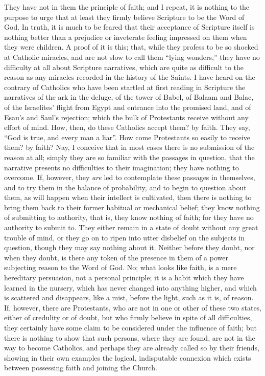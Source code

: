 They have not in them the principle of faith; and I repeat, it is
nothing to the purpose to urge that at least they firmly believe
Scripture to be the Word of God. In truth, it is much to be feared
that their acceptance of Scripture itself is nothing better than a
prejudice or inveterate feeling impressed on them when they were
children. A proof of it is this; that, while they profess to be so
shocked at Catholic miracles, and are not slow to call them
``lying wonders,'' they have no difficulty at all about
Scripture narratives, which are quite as difficult to the reason as
any miracles recorded in the history of the Saints. I have heard on
the contrary of Catholics who have been startled at first reading in
Scripture the narratives of the ark in the deluge, of the tower of
Babel, of Balaam and Balac, of the Israelites' flight from Egypt and
entrance into the promised land, and of Esau's and Saul's rejection;
which the bulk of Protestants receive without any effort of mind. How,
then, do these Catholics accept them? by faith. They say, ``God is
true, and every man a liar''. How come Protestants so easily to
receive them? by faith? Nay, I conceive that in most cases there is no
submission of the reason at all; simply they are so familiar with the
passages in question, that the narrative presents no difficulties to
their imagination; they have nothing to overcome. If, however, they \emph{are}
led to contemplate these passages in themselves, and to try them in
the balance of probability, and to begin to question about them, as
will happen when their intellect is cultivated, then there is nothing
to bring them back to their former habitual or mechanical belief; they
know nothing of submitting to authority, that is, they know nothing of
faith; for they have no authority to submit to. They either remain in
a state of doubt without any great trouble of mind, or they go on to
ripen into utter disbelief on the subjects in question, though they
may say nothing about it. Neither before they doubt, nor when they
doubt, is there any token of the presence in them of a power
subjecting reason to the Word of God. No; what looks like faith, is a
mere hereditary persuasion, not a personal principle; it is a habit
which they have learned in the nursery, which has never changed into
anything higher, and which is scattered and disappears, like a mist,
before the light, such as it is, of reason. If, however, there are
Protestants, who are not in one or other of these two states, either
of credulity or of doubt, but who firmly believe in spite of all
difficulties, they certainly have some claim to be considered under
the influence of faith; but there is nothing to show that such
persons, where they are found, are not in the way to become Catholics,
and perhaps they are already called so by their friends, showing in
their own examples the logical, indisputable connexion which exists
between possessing faith and joining the Church.


